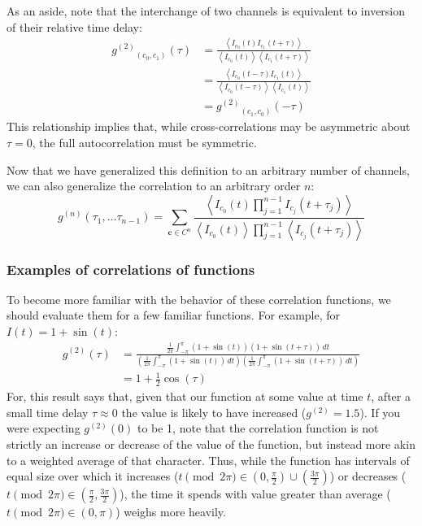 \documentclass{article}
\newcommand{\angles}[1]{\ensuremath{\left\langle #1 \right\rangle}}
\newcommand{\gn}[1]{\ensuremath{g^{(#1)}}}
\renewcommand{\vec}{\mathbf}
\begin{document}
As an aside, note that the interchange of two channels is equivalent to inversion of their relative time delay:
\begin{align}
\gn{2}_{(c_{0},c_{1})}(\tau)&=\frac{\angles{I_{c_{0}}(t)I_{c_{1}}(t+\tau)}}
                                                {\angles{I_{c_{0}}(t)}\angles{I_{c_{1}}(t+\tau)}} \\
                            &=\frac{\angles{I_{c_{0}}(t-\tau)I_{c_{1}}(t)}}
                                                {\angles{I_{c_{0}}(t-\tau)}\angles{I_{c_{1}}(t)}} \\
                            &= \gn{2}_{(c_{1}, c_{0})}(-\tau)
\end{align}
This relationship implies that, while cross-correlations may be asymmetric about $\tau=0$, the full autocorrelation must be symmetric. 

Now that we have generalized this definition to an arbitrary number of channels, we can also generalize the correlation to an arbitrary order $n$:
\begin{equation}
\label{eq:gn}
\gn{n}(\tau_{1},\ldots\tau_{n-1}) = \sum_{\vec{c}\in C^{n}}{
     \frac{\angles{I_{c_{0}}(t)\prod_{j=1}^{n-1}{I_{c_{j}}(t+\tau_{j})}}}
          {\angles{I_{c_{0}}(t)}\prod_{j=1}^{n-1}{\angles{I_{c_{j}}(t+\tau_{j})}}}} 
\end{equation}

\subsubsection{Examples of correlations of functions}
To become more familiar with the behavior of these correlation functions, we should evaluate them for a few familiar functions. For example, for $I(t)=1+\sin{(t)}$:
\begin{align}
\gn{2}(\tau) &= \frac{\frac{1}{2\pi}\int_{-\pi}^{\pi}{\left(1+\sin{(t)}\right)\left(1+\sin{(t+\tau)}\right)\,dt}}
                     {\left(\frac{1}{2\pi}\int_{-\pi}^{\pi}{\left(1+\sin{(t)}\right)\,dt}\right)
                      \left(\frac{1}{2\pi}\int_{-\pi}^{\pi}{\left(1+\sin{(t+\tau)}\right)\,dt}\right)} \\
             &= 1 + \frac{1}{2}\cos{(\tau)}
\end{align}
For, this result says that, given that our function at some value at time $t$, after a small time delay $\tau\approx 0$ the value is likely to have increased ($\gn{2}=1.5$). If you were expecting $\gn{2}(0)$ to be 1, note that the correlation function is not strictly an increase or decrease of the value of the function, but instead more akin to a weighted average of that character. Thus, while the function has intervals of equal size over which it increases ($t\pmod{2\pi} \in (0,\frac{\pi}{2})\cup(\frac{3\pi}{2})$) or decreases ($t\pmod{2\pi} \in (\frac{\pi}{2},\frac{3\pi}{2})$), the time it spends with value greater than average ($t\pmod{2\pi}\in(0,\pi)$) weighs more heavily. 
\end{document}
